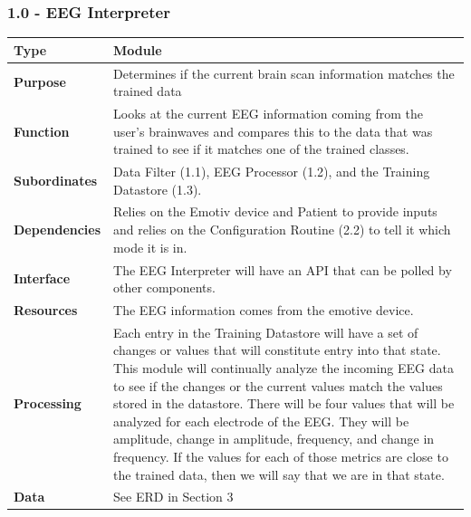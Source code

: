 \documentclass{article}
\begin{document}
\subsubsection*{1.0 - EEG Interpreter}
\begin{tabular}{ | l |  p{13.3cm} |}
\hline
\textbf{Type} & Module \\ \hline
\textbf{Purpose} & Determines if the current brain scan information matches the trained data \\ \hline
\textbf{Function} & Looks at the current EEG information coming from the user's brainwaves and compares this to the data that was trained to see if it matches one of the trained classes. \\ \hline
\textbf{Subordinates} & Data Filter (1.1), EEG Processor (1.2), and the Training Datastore (1.3). \\ \hline
\textbf{Dependencies} & Relies on the Emotiv device and Patient to provide inputs and relies on the Configuration Routine (2.2) to tell it which mode it is in. \\ \hline
\textbf{Interface} & The EEG Interpreter will have an API that can be polled by other components. \\ \hline
\textbf{Resources} & The EEG information comes from the emotive device. \\ \hline
\textbf{Processing} & Each entry in the Training Datastore will have a set of changes or values that will constitute entry into that state. This module will continually analyze the incoming EEG data to see if the changes or the current values match the values stored in the datastore. There will be four values that will be analyzed for each electrode of the EEG. They will be amplitude, change in amplitude, frequency, and change in frequency. If the values for each of those metrics are close to the trained data, then we will say that we are in that state.\\ \hline
\textbf{Data} & See ERD in Section 3 \\ \hline
\end{tabular}
\end{document}
